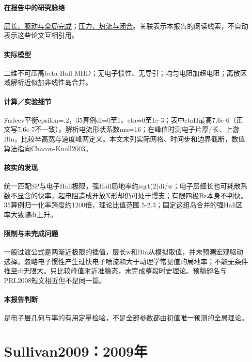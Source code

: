 \paragraph{在报告中的研究脉络}\hyperref[story:global]{层长、驱动与全局完成}；\hyperref[story:closure]{压力、热流与闭合}。关联表示本报告的阅读线索，不自动表示这些论文互相引用。

\paragraph{实际模型}二维不可压高beta Hall MHD；无电子惯性、无导引；均匀电阻加超电阻；离散区域解析近似加非线性岛合并。

\paragraph{计算／实验细节}Fadeev平衡epsilon=.2，35算例di=0至1、eta=0至1e-3；表中etaH最高7.6e-6（正文写7.6e-7不一致）。解析电流形状系数mu=16；在峰值时测电子片厚/长、上游Bin，比较半高宽与速度峰两定义。本文未列实际网格、时间步和边界截断，数值算法指向Chacon-Knoll2003。

\paragraph{核实的发现}统一匹配SP与电子Hall极限，强Hall局地率约sqrt(2)di/w；电子层细长也可耗散系数不显含的快率，超电阻造成开放X形却仍可处于慢支；有限四极Bz本身不判快。35算例归一化率跨度约1200倍，理论比值范围.5-2.3；固定这组岛合并的强Hall区率大致随di上升。

\paragraph{限制与未完成问题}一般过渡公式是两渐近极限的插值，层长w和Bin从模拟取值，并未预测宏观驱动选择。忽略电子惯性产生过快电子喷流和大于动理学常见值的局地率；不能无条件推至di无限大。只比较峰值附近准稳态，未完成整段时史理论。预稿题名与PRL2008短文相近但不是同一篇。

\paragraph{本报告判断}是电子层几何与率的有用定量检验，不是全部参数都由初值唯一预测的全局理论。

\section{Sullivan2009：2009年}\label{paper:Sullivan2009}

